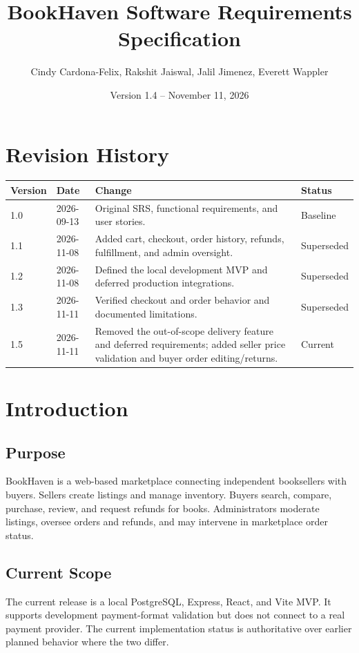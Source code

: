 \documentclass[11pt]{scrreprt}
\title{BookHaven Software Requirements Specification}
\author{Cindy Cardona-Felix, Rakshit Jaiswal, Jalil Jimenez, Everett Wappler}
\date{Version 1.4 -- November 11, 2026}
\begin{document}
\maketitle
\tableofcontents

\chapter*{Revision History}
\begin{longtable}{p{1.1cm}p{2.8cm}p{8.8cm}p{2.2cm}}
\toprule
\textbf{Version} & \textbf{Date} & \textbf{Change} & \textbf{Status}\\
\midrule
1.0 & 2026-09-13 & Original SRS, functional requirements, and user stories. & Baseline\\
1.1 & 2026-11-08 & Added cart, checkout, order history, refunds, fulfillment, and admin oversight. & Superseded\\
1.2 & 2026-11-08 & Defined the local development MVP and deferred production integrations. & Superseded\\
1.3 & 2026-11-11 & Verified checkout and order behavior and documented limitations. & Superseded\\
1.5 & 2026-11-11 & Removed the out-of-scope delivery feature and deferred requirements; added seller price validation and buyer order editing/returns. & Current\\
\bottomrule
\end{longtable}

\chapter{Introduction}

\section{Purpose}
BookHaven is a web-based marketplace connecting independent booksellers with
buyers. Sellers create listings and manage inventory. Buyers search, compare,
purchase, review, and request refunds for books. Administrators moderate
listings, oversee orders and refunds, and may intervene in marketplace order
status.

\section{Current Scope}
The current release is a local PostgreSQL, Express, React, and Vite MVP. It
supports development payment-format validation but does not connect to a real
payment provider. The current implementation status is authoritative over
earlier planned behavior where the two differ.
\end{document}
